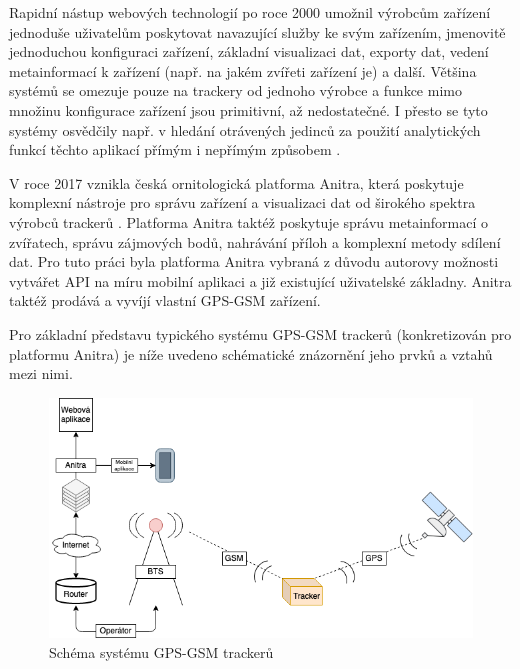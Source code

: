Rapidní nástup webových technologií po roce 2000 umožnil výrobcům zařízení jednoduše uživatelům poskytovat navazující služby ke svým zařízením, jmenovitě jednoduchou konfiguraci zařízení, základní visualizaci dat, exporty dat, vedení metainformací k zařízení (např. na jakém zvířeti zařízení je) a další. Většina systémů se omezuje pouze na trackery od jednoho výrobce a funkce mimo množinu konfigurace zařízení jsou primitivní, až nedostatečné. I přesto se tyto systémy osvědčily např. v hledání otrávených jedinců za použití analytických funkcí těchto aplikací přímým i nepřímým způsobem \cite{stoynov2018early}.

V roce 2017 vznikla česká ornitologická platforma Anitra, která poskytuje komplexní nástroje pro správu zařízení a visualizaci dat od širokého spektra výrobců trackerů \cite{krouzkovaniPtakuAnitra}. Platforma Anitra taktéž poskytuje správu metainformací o zvířatech, správu zájmových bodů, nahrávání příloh a komplexní metody sdílení dat. Pro tuto práci byla platforma Anitra vybraná z důvodu autorovy možnosti vytvářet API na míru mobilní aplikaci a již existující uživatelské základny. Anitra taktéž prodává a vyvíjí vlastní GPS-GSM zařízení.

Pro základní představu typického systému GPS-GSM trackerů (konkretizován pro platformu Anitra) je níže uvedeno schématické znázornění jeho prvků a vztahů mezi nimi.

\begin{figure}[h]
	\includegraphics[width=\linewidth]{img/diagram_system.png}
	\caption{Schéma systému GPS-GSM trackerů}
	\label{fig:boat1}
\end{figure}